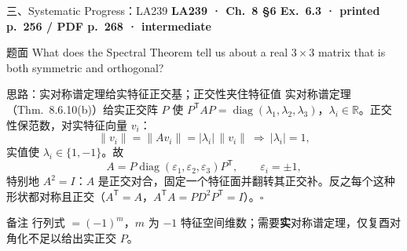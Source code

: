 \documentclass[aspectratio=169,10pt,fontset=none]{ctexbeamer}
\newcommand{\ex}[1]{\textcolor{accent}{\footnotesize\bfseries #1}}
\begin{document}
\begin{frame}[t]{三、Systematic Progress：LA239}
  \leavevmode\ex{LA239 · Ch.~8 §6 Ex.~6.3 · printed p.~256 / PDF p.~268 · intermediate}
  \begin{block}{\footnotesize 题面}
    \scriptsize What does the Spectral Theorem tell us about a real $3\times3$ matrix that is both symmetric and orthogonal?
  \end{block}
  \begin{exampleblock}{\footnotesize 思路：实对称谱定理给实特征正交基；正交性夹住特征值}
    \scriptsize
    实对称谱定理（Thm.~8.6.10(b)）给实正交阵 $P$ 使 $P^{\mathsf T}AP=\operatorname{diag}(\lambda_1,\lambda_2,\lambda_3)$，$\lambda_i\in\mathbb R$。正交性保范数，对实特征向量 $v_i$：
    $$\lVert v_i\rVert=\lVert Av_i\rVert=|\lambda_i|\,\lVert v_i\rVert\ \Longrightarrow\ |\lambda_i|=1,$$
    实值使 $\lambda_i\in\{1,-1\}$。故
    $$\boxed{A=P\operatorname{diag}(\varepsilon_1,\varepsilon_2,\varepsilon_3)P^{\mathsf T},\qquad \varepsilon_i=\pm1,}$$
    特别地 $A^2=I$：$A$ 是正交对合，固定一个特征面并翻转其正交补。反之每个这种形状都对称且正交（$A^{\mathsf T}=A$，$A^{\mathsf T}A=PD^2P^{\mathsf T}=I$）。$\square$
  \end{exampleblock}
  \begin{block}{\footnotesize 备注}
    \scriptsize 行列式 $=(-1)^m$，$m$ 为 $-1$ 特征空间维数；需要\textbf{实}对称谱定理，仅复酉对角化不足以给出实正交 $P$。
  \end{block}
\end{frame}
\end{document}
